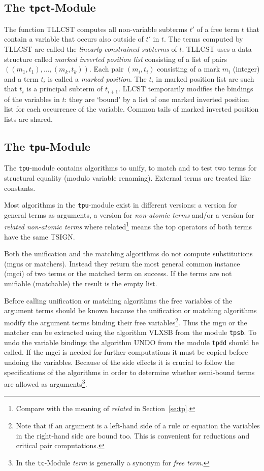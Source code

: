\subsection{The {\tt tpct}-Module}

The function TLLCST computes all non-variable subterms $t'$ 
of a free term $t$
that contain a variable that occurs also outside of $t'$ in $t$.
The terms computed by TLLCST are called the
{\em linearly constrained subterms} of $t$.
TLLCST uses a data structure called 
{\em marked inverted position list} consisting of a list
of pairs
\( ((m_1,t_1),\ldots,(m_k,t_k)) \).
Each pair $(m_i,t_i)$ consisting of a mark  $m_i$ (integer) and a term $t_i$
is called a {\em marked position}.
The $t_i$ in  marked position list are such that $t_i$ is a
principal subterm of $t_{i+1}$.
LLCST temporarily modifies the bindings of the variables in $t$: they 
are `bound' by a list of one marked inverted position list for each
occurrence of the variable.
Common tails of marked inverted position lists are shared.

\subsection{The {\tt tpu}-Module}

The {\tt tpu}-module contains algorithms to unify, to match and to test two
terms for structural equality (modulo variable renaming).
External terms are treated like constants.

Most algorithms in the {\tt tpu}-module exist in different versions:
a version for general terms as arguments, a version for {\em non-atomic terms}
and/or a version for {\em related non-atomic terms} where
related\footnote{Compare with the meaning of {\em related} in
Section~\ref{se:tp}.} means the top operators of both terms have the same TSIGN.

Both the unification and the matching algorithms do not
compute substitutions (mgus or matchers).
Instead they return the most general common instance (mgci) of two terms
or the matched term on success.
If the terms are not unifiable (matchable) the result is the empty list.

Before calling unification or matching algorithms the free variables of the
argument terms should be known because the unification or matching algorithms
modify the argument terms binding their free variables\footnote{Note that if
an argument is a left-hand side of a rule or equation the variables in the
right-hand side are bound too. This is convenient for reductions and critical
pair computations.}.
Thus the mgu or the matcher can be extracted using the algorithm VLXSB
from the module {\tt tpsb}.
To undo the variable bindings the algorithm UNDO from the module {\tt tpdd}
should be called.
If the mgci is needed for further computations it must be copied before undoing
the variables.
Because of the side effects it is crucial to follow the
specifications of the algorithms in order to determine whether semi-bound
terms are allowed as arguments\footnote{In the {\tt tc}-Module {\em term}
is generally a synonym for {\em free term}.}.

